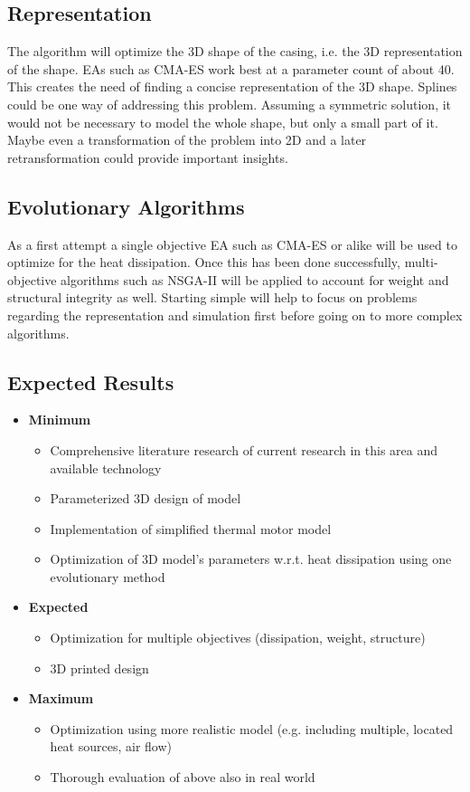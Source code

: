 \documentclass[12pt]{article}
\begin{document}
\subsection{Representation}
The algorithm will optimize the 3D shape of the casing, i.e. the 3D representation of the shape. 
EAs such as CMA-ES work best at a parameter count of about 40.
This creates the need of finding a concise representation of the 3D shape.
Splines could be one way of addressing this problem.
Assuming a symmetric solution, it would not be necessary to model the whole shape, but only a small part of it.
Maybe even a transformation of the problem into 2D and a later retransformation could provide important insights.

\subsection{Evolutionary Algorithms}
As a first attempt a single objective EA such as CMA-ES\cite{hansen2001completely} or alike will be used to optimize for the heat dissipation.
Once this has been done successfully, multi-objective algorithms such as NSGA-II\cite{deb2002fast} will be applied to account for weight and structural integrity as well.
Starting simple will help to focus on problems regarding the representation and simulation first before going on to more complex algorithms.

\subsection{Expected Results}
\begin{itemize}
\item \textbf{Minimum}
\begin{itemize}
	\item Comprehensive literature research of current research in this area and available technology
	\item Parameterized 3D design of model
	\item Implementation of simplified thermal motor model
	\item Optimization of 3D model's parameters w.r.t. heat dissipation using one evolutionary method
\end{itemize}

\item \textbf{Expected}
\begin{itemize}

	\item Optimization for multiple objectives (dissipation, weight, structure)
	\item 3D printed design
	
\end{itemize}

\item \textbf{Maximum}
\begin{itemize}
	\item Optimization using more realistic model (e.g. including multiple, located heat sources, air flow)
	\item Thorough evaluation of above also in real world
\end{itemize} 
\end{itemize}
\end{document}
